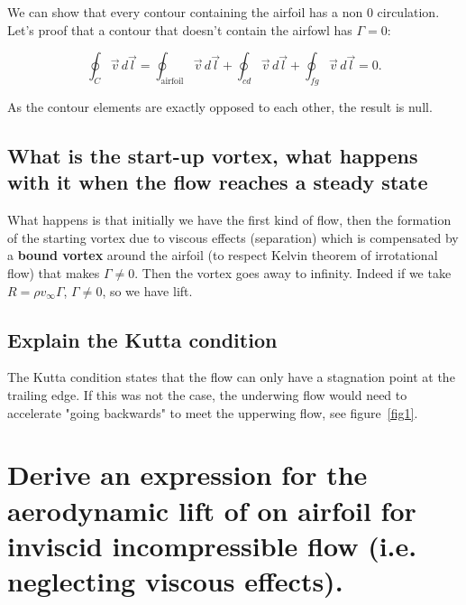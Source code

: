 \documentclass[british,french,11pt, a4paper, openany]{article}
\begin{document}
We can show that every contour containing the airfoil has a non 0 circulation. Let's proof that a contour that doesn't contain the airfowl has $\Gamma =0$: 

\begin{equation}
\oint _{C} \vec{v}\, d\vec{l} = \oint _{\mbox{airfoil}} \vec{v}\, d\vec{l} + \oint _{cd} \vec{v}\, d\vec{l} + \oint _{fg} \vec{v}\, d\vec{l} = 0. 
\end{equation}

As the contour elements are exactly opposed to each other, the result is null. 

\subsection{What is the start-up vortex, what happens with it when the flow reaches a steady state}
What happens is that initially we have the first kind of flow, then the formation of the starting vortex due to viscous effects (separation) which is compensated by a \textbf{bound vortex} around the airfoil (to respect Kelvin theorem of irrotational flow) that makes $\Gamma \neq 0$. Then the vortex goes away to infinity. Indeed if we take $R = \rho v_\infty \Gamma$, $\Gamma \neq 0$, so we have lift. 
\subsection{Explain the Kutta condition}
The Kutta condition states that the flow can only have a stagnation point at the trailing edge. If this was not the case, the underwing flow would need to accelerate "going backwards" to meet the upperwing flow, see figure~\ref{fig1}.


\section{Derive an expression for the aerodynamic lift of on airfoil for inviscid incompressible flow (i.e. neglecting viscous effects).}
\end{document}

